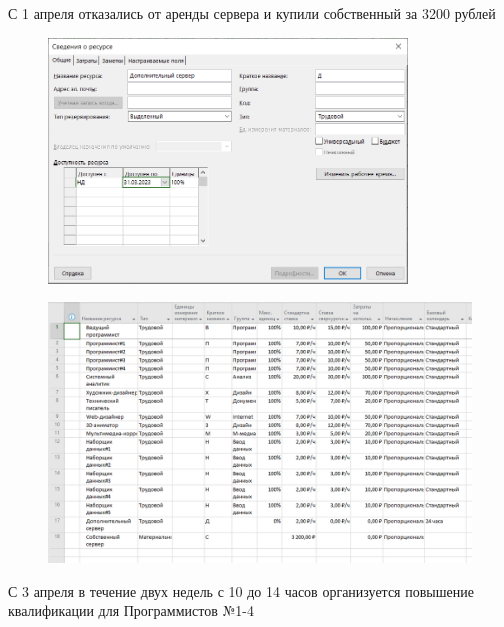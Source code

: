 С 1 апреля отказались от аренды сервера и купили собственный за 3200 рублей

\begin{figure}[H]
	\begin{center}
		\includegraphics[width=0.85\textwidth]{imgs/task_1_9.png}
	\end{center}
\end{figure}

\begin{figure}[H]
	\begin{center}
		\includegraphics[width=\textwidth]{imgs/task_1_10.png}
	\end{center}
\end{figure}

С 3 апреля в течение двух недель с 10 до 14 часов организуется повышение квалификации для Программистов №1-4


